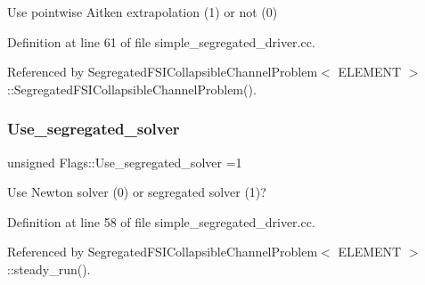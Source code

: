 Use pointwise Aitken extrapolation (1) or not (0) 



Definition at line 61 of file simple\+\_\+segregated\+\_\+driver.\+cc.



Referenced by Segregated\+F\+S\+I\+Collapsible\+Channel\+Problem$<$ E\+L\+E\+M\+E\+N\+T $>$\+::\+Segregated\+F\+S\+I\+Collapsible\+Channel\+Problem().

\mbox{\label{namespaceFlags_a2cdfa6b776b959a060a1f2e8d4918789}} 
\subsubsection{\texorpdfstring{Use\+\_\+segregated\+\_\+solver}{Use\_segregated\_solver}}
{\footnotesize\ttfamily unsigned Flags\+::\+Use\+\_\+segregated\+\_\+solver =1}



Use Newton solver (0) or segregated solver (1)? 



Definition at line 58 of file simple\+\_\+segregated\+\_\+driver.\+cc.



Referenced by Segregated\+F\+S\+I\+Collapsible\+Channel\+Problem$<$ E\+L\+E\+M\+E\+N\+T $>$\+::steady\+\_\+run().

